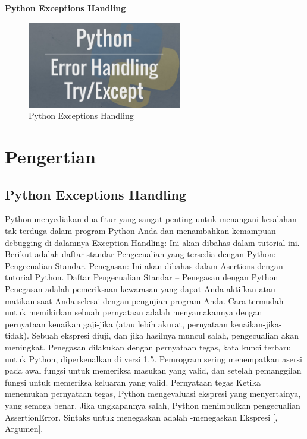 \sloppy
\begin{center}{\fontsize{24pt}{24pt}\selectfont \textbf{Python Exceptions Handling}  \\}\end{center} 
\vspace{12pt}
\vspace{12pt}
 
 
 \begin{figure}[ht]
 	\centerline{\includegraphics[width=0.60\textwidth]{Gambar/dapi6.jpg}}
 	\caption{Python Exceptions Handling}
 	\label{Python Exceptions Handling}
 \end{figure}
 
 
 
 \section {Pengertian }
 \subsection {Python Exceptions Handling}
 
 
 \hspace*{0.64in} Python menyediakan dua fitur yang sangat penting untuk menangani kesalahan tak terduga dalam program Python Anda dan menambahkan kemampuan debugging di dalamnya Exception Handling: Ini akan dibahas dalam tutorial ini. Berikut adalah daftar standar Pengecualian yang tersedia dengan Python: Pengecualian Standar. Penegasan: Ini akan dibahas dalam Asertions dengan tutorial Python. Daftar Pengecualian Standar – Penegasan dengan Python Penegasan adalah pemeriksaan kewarasan yang dapat Anda aktifkan atau matikan saat Anda selesai dengan pengujian program Anda. Cara termudah untuk memikirkan sebuah pernyataan adalah menyamakannya dengan pernyataan kenaikan gaji-jika (atau lebih akurat, pernyataan kenaikan-jika-tidak). Sebuah ekspresi diuji, dan jika hasilnya muncul salah, pengecualian akan meningkat. Penegasan dilakukan dengan pernyataan tegas, kata kunci terbaru untuk Python, diperkenalkan di versi 1.5. Pemrogram sering menempatkan asersi pada awal fungsi untuk memeriksa masukan yang valid, dan setelah pemanggilan fungsi untuk memeriksa keluaran yang valid. Pernyataan tegas Ketika menemukan pernyataan tegas, Python mengevaluasi ekspresi yang menyertainya, yang semoga benar. Jika ungkapannya salah, Python menimbulkan pengecualian AssertionError. Sintaks untuk menegaskan adalah -menegaskan Ekspresi [, Argumen]. 
 
